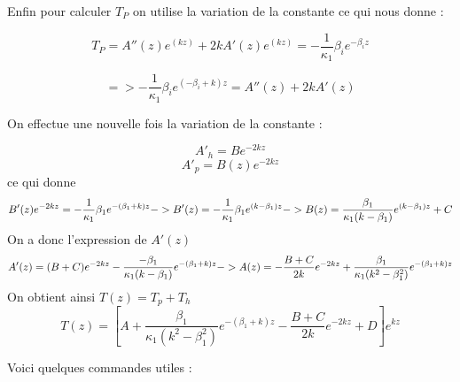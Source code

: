 \documentclass{rapportECC}
\begin{document}
Enfin pour calculer $T_P$ on utilise la variation de la constante ce qui nous donne :

\begin{equation*}
            T_P = A''(z)e^{(kz)} + 2k A'(z)e^{(kz)} = - \frac{1}{\kappa_1}\beta_i e^{-\beta_iz} 
\end{equation*}

\begin{equation*}
            => - \frac{1}{\kappa_1}\beta_i e^{(-\beta_i + k)z} = A''(z) + 2k A'(z)
\end{equation*}

On effectue une nouvelle fois la variation de la constante :

\begin{equation*}
    A'_h = B e^{-2kz}
\end{equation*}
\begin{equation*}
    A'_p = B(z) e^{-2kz}
\end{equation*}
ce qui donne
\begin{equation*}
   B'(z)e^{-2kz} = -\frac{1}{\kappa_1}\beta_1 e^{-(\beta_1+k)z}\\
   -> B'(z) = -\frac{1}{\kappa_1}\beta_1 e^{(k-\beta_1)z}
   -> B(z) = \frac{\beta_1}{\kappa_1(k-\beta_1)}e^{(k-\beta_1)z} + C
\end{equation*}
On a donc l'expression de $A'(z)$
\begin{equation*}
   A'(z)=(B+C)e^{-2kz} -\frac{-\beta_1}{\kappa_1(k-\beta_1)} e^{-(\beta_1+k)z}\\
   -> A(z) = -\frac{B+C}{2k}e^{-2kz}+\frac{\beta_1}{\kappa_1(k^2-\beta_1^2)} e^{-(\beta_1+k)z}
\end{equation*}
On obtient ainsi $T(z) = T_p + T_h$
\begin{equation*}
            T(z) = \left[A+\frac{\beta_1}{\kappa_1(k^2-\beta_1^2)}e^{-(\beta_1+k)z}-\frac{B+C}{2k}e^{-2kz}+D\right]e^{kz} 
\end{equation*}

























Voici quelques commandes utiles : \cite{Lamport}
\end{document}
